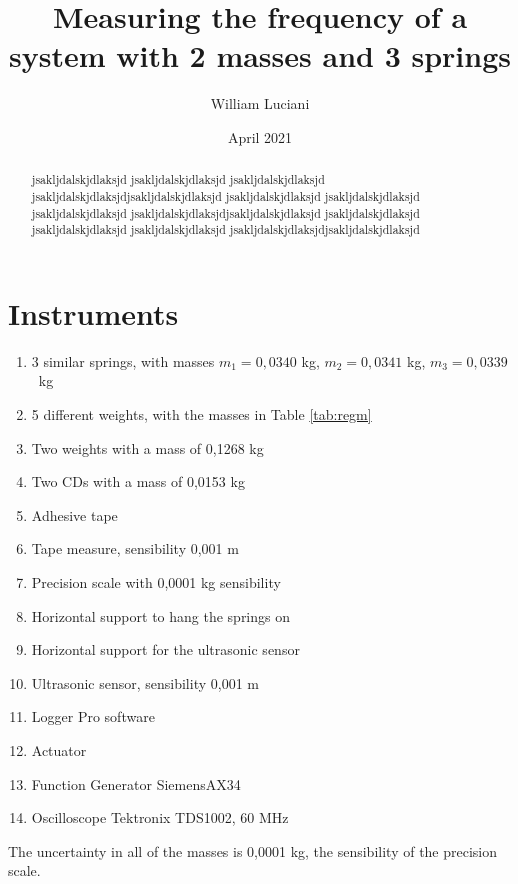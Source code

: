 \documentclass{article}
\title{ Measuring the frequency  of a system with 2 masses and 3 springs}
\author{William Luciani}
\date{April 2021}
\begin{document}
\maketitle

\begin{abstract}
    jsakljdalskjdlaksjd jsakljdalskjdlaksjd jsakljdalskjdlaksjd jsakljdalskjdlaksjdjsakljdalskjdlaksjd
    jsakljdalskjdlaksjd jsakljdalskjdlaksjd jsakljdalskjdlaksjd jsakljdalskjdlaksjdjsakljdalskjdlaksjd
    jsakljdalskjdlaksjd jsakljdalskjdlaksjd jsakljdalskjdlaksjd jsakljdalskjdlaksjdjsakljdalskjdlaksjd
\end{abstract}

\section{Instruments} \label{sec:instr}
\begin{enumerate}
    \item 3 similar springs, with masses $m_1 = 0,0340$ kg, $m_2 = 0,0341$ kg, \hbox{$m_3 = 0,0339$ kg}
    \item 5 different weights, with the masses in Table \ref{tab:regm}
    \item Two weights with a mass of 0,1268 kg
    \item Two CDs with a mass of 0,0153 kg          %
    \item Adhesive tape
    \item Tape measure, sensibility 0,001 m
    \item Precision scale with 0,0001 kg sensibility
    \item Horizontal support to hang the springs on
    \item Horizontal support for the ultrasonic sensor
    \item Ultrasonic sensor, sensibility 0,001 m
    \item Logger Pro software
    \item Actuator
    \item Function Generator SiemensAX34
    \item Oscilloscope Tektronix TDS1002, 60 MHz
\end{enumerate}
The uncertainty in all of the masses is 0,0001 kg, the sensibility of the precision scale.

\end{document}

